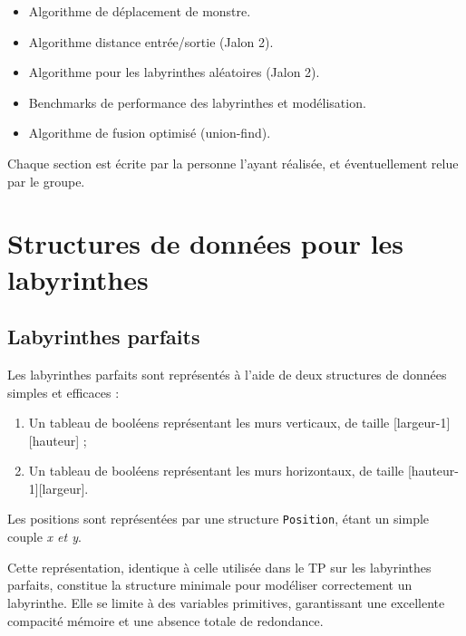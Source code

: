 \documentclass{butexFR}
\begin{document}
\begin{itemize}
    \item Algorithme de déplacement de monstre.
\end{itemize}


\begin{itemize}
\item Algorithme distance entrée/sortie (Jalon 2).
\item Algorithme pour les labyrinthes aléatoires (Jalon 2).
\item Benchmarks de performance des labyrinthes et modélisation.
\item Algorithme de fusion optimisé (union-find).
\end{itemize}


Chaque section est écrite par la personne l'ayant réalisée, et éventuellement relue par le groupe.

\newpage

\section{Structures de données pour les labyrinthes}

\subsection{Labyrinthes parfaits}

Les labyrinthes parfaits sont représentés à l’aide de deux structures de données simples et efficaces :

\begin{enumerate}
\item Un tableau de booléens représentant les murs verticaux, de taille [largeur-1][hauteur] ;
\item Un tableau de booléens représentant les murs horizontaux, de taille [hauteur-1][largeur].
\end{enumerate}

Les positions sont représentées par une structure \texttt{Position}, étant un simple couple \textit{x et y}.

Cette représentation, identique à celle utilisée dans le TP sur les labyrinthes parfaits, constitue la structure minimale pour modéliser correctement un labyrinthe. Elle se limite à des variables primitives, garantissant une excellente compacité mémoire et une absence totale de redondance.
\end{document}
